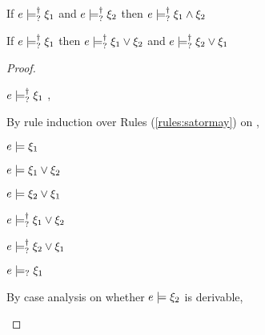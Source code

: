 \begin{lem}
  \label{lem:satormay-and}
  If $e \models_{?}^{\dag} \xi_1$ and $e \models_{?}^{\dag} \xi_2$ then $e \models_{?}^{\dag} \xi_1 \wedge \xi_2$
\end{lem}

\begin{lem}
  \label{lem:satormay-or}
  If $e \models_{?}^{\dag} \xi_1$ then $e \models_{?}^{\dag} \xi_1 \vee \xi_2$ and
$e \models_{?}^{\dag} \xi_2 \vee \xi_1$
\end{lem}
\begin{proof}
\begin{pfsteps*}
\item $e \models_{?}^{\dag} \xi_1$  ,
\end{pfsteps*}
By rule induction over Rules (\ref{rules:satormay}) on ,
\begin{byCases}

\item[\text{(\ref{rule:CSMSSat})}]
  \begin{pfsteps*}
  \item $e \models \xi_1$  
  \item $e \models \xi_1 \vee \xi_2$  
  \item $e \models \xi_2 \vee \xi_1$  
  \item $e \models_{?}^{\dag} \xi_1 \vee \xi_2$ 
  \item $e \models_{?}^{\dag} \xi_2 \vee \xi_1$ 
  \end{pfsteps*}


\item[\text{(\ref{rule:CSMSMay})}]
  \begin{pfsteps*}
  \item $e \models_{?} \xi_1$  
  \end{pfsteps*}
  By case analysis on whether $e \models \xi_2$ is derivable,
  \begin{byCases}


\end{byCases}
\end{byCases}
\end{proof}
